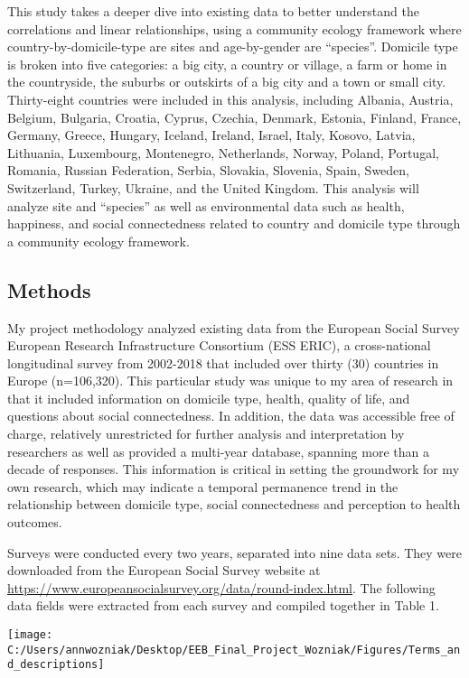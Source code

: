 This study takes a deeper dive into existing data to better understand
the correlations and linear relationships, using a community ecology
framework where country-by-domicile-type are sites and age-by-gender are
``species''. Domicile type is broken into five categories: a big city, a
country or village, a farm or home in the countryside, the suburbs or
outskirts of a big city and a town or small city. Thirty-eight countries
were included in this analysis, including Albania, Austria, Belgium,
Bulgaria, Croatia, Cyprus, Czechia, Denmark, Estonia, Finland, France,
Germany, Greece, Hungary, Iceland, Ireland, Israel, Italy, Kosovo,
Latvia, Lithuania, Luxembourg, Montenegro, Netherlands, Norway, Poland,
Portugal, Romania, Russian Federation, Serbia, Slovakia, Slovenia,
Spain, Sweden, Switzerland, Turkey, Ukraine, and the United Kingdom.
This analysis will analyze site and ``species'' as well as environmental
data such as health, happiness, and social connectedness related to
country and domicile type through a community ecology framework.

\hypertarget{methods}{%
\subsection{Methods}\label{methods}}

My project methodology analyzed existing data from the European Social
Survey European Research Infrastructure Consortium (ESS ERIC), a
cross-national longitudinal survey from 2002-2018 that included over
thirty (30) countries in Europe (n=106,320). This particular study was
unique to my area of research in that it included information on
domicile type, health, quality of life, and questions about social
connectedness. In addition, the data was accessible free of charge,
relatively unrestricted for further analysis and interpretation by
researchers as well as provided a multi-year database, spanning more
than a decade of responses. This information is critical in setting the
groundwork for my own research, which may indicate a temporal permanence
trend in the relationship between domicile type, social connectedness
and perception to health outcomes.

Surveys were conducted every two years, separated into nine data sets.
They were downloaded from the European Social Survey website at
\url{https://www.europeansocialsurvey.org/data/round-index.html}. The
following data fields were extracted from each survey and compiled
together in Table 1.

\begin{Schunk}

\texttt{[image: C:/Users/annwozniak/Desktop/EEB\_Final\_Project\_Wozniak/Figures/Terms\_and\_descriptions]} \end{Schunk}

